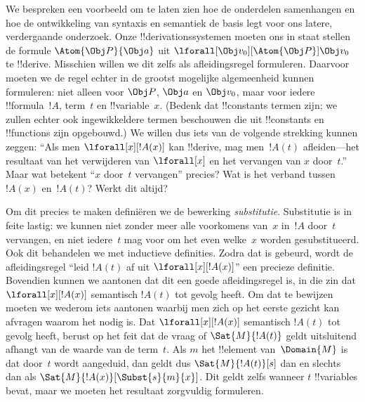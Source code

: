 \documentclass[openany]{memoir}
\begin{document}


We bespreken een voorbeeld om te laten zien hoe de onderdelen
samenhangen en hoe de ontwikkeling van syntaxis en semantiek de basis
legt voor ons latere, verdergaande onderzoek. Onze
!!{derivation}ssystemen moeten ons in staat stellen de formule
$\Atom{\Obj P}{\Obj a}$ uit $\lforall[\Obj
v_0][\Atom{\Obj P}]{\Obj v_0}$ te !!{derive}. Misschien willen we dit zelfs als
afleidingsregel formuleren. Daarvoor moeten we de regel echter in de
grootst mogelijke algemeenheid kunnen formuleren: niet alleen voor
$\Obj P$, $\Obj a$ en $\Obj v_0$, maar voor iedere !!{formula}~$!A$,
term~$t$ en !!{variable}~$x$. (Bedenk dat !!{constant}s termen zijn;
we zullen echter ook ingewikkeldere termen beschouwen die uit
!!{constant}s en !!{function}s zijn opgebouwd.) We willen dus iets van
de volgende strekking kunnen zeggen: ``Als men
$\lforall[x][!A(x)]$ kan !!{derive}, mag men~$!A(t)$ afleiden---het
resultaat van het verwijderen van $\lforall[x]$ en het vervangen van
$x$ door~$t$.'' Maar wat betekent ``$x$ door~$t$ vervangen'' precies?
Wat is het verband tussen $!A(x)$ en~$!A(t)$? Werkt dit altijd?

Om dit precies te maken definiëren we de bewerking
\emph{substitutie}. Substitutie is in feite lastig: we kunnen niet
zonder meer alle voorkomens van~$x$ in~$!A$ door~$t$ vervangen, en niet
iedere~$t$ mag voor om het even welke~$x$ worden gesubstitueerd. Ook dit
behandelen we met inductieve definities. Zodra dat is gebeurd, wordt de
afleidingsregel ``leid $!A(t)$ af uit $\lforall[x][!A(x)]$'' een
precieze definitie. Bovendien kunnen we aantonen dat dit een goede
afleidingsregel is, in die zin dat $\lforall[x][!A(x)]$ semantisch
$!A(t)$ tot gevolg heeft. Om dat te bewijzen moeten we wederom iets
aantonen waarbij men zich op het eerste gezicht kan afvragen waarom het
nodig is. Dat $\lforall[x][!A(x)]$ semantisch $!A(t)$ tot gevolg heeft,
berust op het feit dat de vraag of $\Sat{M}{!A(t)}$ geldt uitsluitend
afhangt van de waarde van de term~$t$. Als $m$ het !!{element}
van~$\Domain{M}$ is dat door~$t$ wordt aangeduid, dan geldt dus
$\Sat{M}{!A(t)}[s]$ dan en slechts dan als
$\Sat{M}{!A(x)}[\Subst{s}{m}{x}]$. Dit geldt zelfs wanneer $t$
!!{variable}s bevat, maar we moeten het resultaat zorgvuldig
formuleren.
\endgroup

\begingroup
\def\olfilename{OLP-0147}
\def\olfilepath{content/first-order-logic/introduction/}
\hypertarget{unit-OLP-0147}{}
\end{document}
